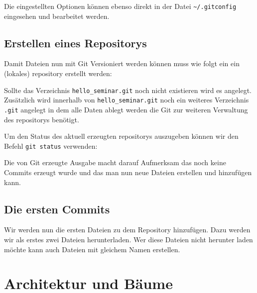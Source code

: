 Die eingestellten Optionen können ebenso direkt in der Datei
\texttt{\textasciitilde/.gitconfig} eingesehen und bearbeitet werden.

\subsection{Erstellen eines Repositorys}\label{startup}
Damit Dateien nun mit Git Versioniert werden können muss wie folgt ein ein (lokales)
\gls{repository} erstellt werden: 



Sollte das Verzeichnis \texttt{hello\_seminar.git} noch nicht existieren wird es
angelegt. Zusätzlich wird innerhalb von \texttt{hello\_seminar.git} noch ein
weiteres Verzeichnis \texttt{.git} angelegt in dem alle Daten ablegt werden die
Git zur weiteren Verwaltung des \glspl{repository} benötigt.

Um den Status des aktuell erzeugten \glspl{repository} auszugeben können wir
den Befehl \texttt{git status} verwenden:



Die von Git erzeugte Ausgabe macht darauf Aufmerksam das noch keine Commits
erzeugt wurde und das man nun neue Dateien erstellen und hinzufügen kann. 




\subsection{Die ersten Commits}\label{first_commits}

Wir werden nun die ersten Dateien zu dem Repository hinzufügen. Dazu werden wir
als erstes zwei Dateien herunterladen. Wer diese Dateien nicht herunter laden
möchte kann auch Dateien mit gleichem Namen erstellen.



\section{Architektur und Bäume}\label{sec:trees}
\label{sec:Konfiguration}
